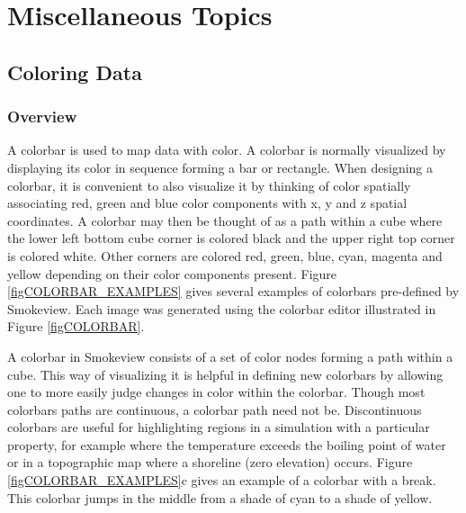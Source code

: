 \documentclass[11pt,twoside]{book}
\begin{document}
\part{Miscellaneous Topics}


\chapter{Coloring Data}
\section{Overview}
A colorbar is used to map
data with color.  A colorbar is normally visualized by
displaying its color in sequence forming a bar or rectangle.
When designing a colorbar, it is convenient to also visualize it
by thinking of color spatially associating red, green and
blue color components with x, y and z spatial coordinates.  A colorbar
may then be thought of as a path within a cube where the lower left bottom
cube corner is colored black and the upper right top corner is colored
white.  Other corners are colored red, green, blue, cyan, magenta and
yellow depending on their color components present.
Figure \ref{figCOLORBAR_EXAMPLES} gives several examples of colorbars pre-defined
by Smokeview.  Each image was generated using the colorbar editor
illustrated in Figure \ref{figCOLORBAR}.

A colorbar in Smokeview consists of a set of color nodes forming a path
within a cube.  This way of visualizing it is helpful in defining new
colorbars by allowing one to more easily judge changes in color within the
colorbar.  Though most colorbars paths are continuous, a colorbar
path need not be.  Discontinuous colorbars
are useful for highlighting regions in a simulation with a particular
property, for example where the temperature exceeds the boiling point of
water or in a topographic map where a shoreline (zero elevation) occurs.
Figure \ref{figCOLORBAR_EXAMPLES}c
gives an example of a colorbar with a break.  This colorbar jumps in the
middle from a shade of cyan to a shade of yellow.

\end{document}
